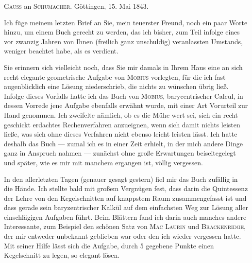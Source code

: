 \begin{center}\textsc{Gauss} an \textsc{Schumacher}. Göttingen, 15. Mai 1843.\end{center}

Ich füge meinem letzten Brief an Sie, mein teuerster Freund, noch ein paar Worte
hinzu, um einem Buch gerecht zu werden, das ich bisher, zum
Teil infolge eines vor zwanzig Jahren von Ihnen (freilich ganz unschuldig)
veranlassten Umstands, weniger beachtet habe, als es verdient.

Sie erinnern sich vielleicht noch, dass Sie mir damals in Ihrem Haus eine an sich
recht elegante geometrische Aufgabe von \textsc{Möbius} vorlegten, für die ich
fast augenblicklich eine Lösung niederschrieb, die nichts zu wünschen übrig ließ. Infolge
dieses Vorfalls hatte ich das Buch von \textsc{Möbius}, barycentrischer Calcul, in
dessen Vorrede jene Aufgabe ebenfalls erwähnt wurde, mit einer Art Vorurteil zur
Hand genommen. Ich zweifelte nämlich, ob es die Mühe wert sei, sich ein recht geschickt
erdachtes Rechenverfahren anzueignen, wenn sich damit nichts leisten
ließe, was sich ohne dieses Verfahren nicht ebenso leicht leisten lässt. Ich hatte deshalb das
Buch --- zumal ich es in einer Zeit erhielt, in der mich andere Dinge ganz
in Anspruch nahmen --- zunächst ohne große Erwartungen beiseitegelegt
und später, wie es mir mit manchem ergangen ist, völlig vergessen.

In den allerletzten Tagen (genauer gesagt gestern) fiel mir das Buch zufällig in die
Hände. Ich stellte bald mit großem Vergnügen fest, dass darin die Quintessenz der
Lehre von den Kegelschnitten auf knappstem Raum zusammengefasst ist und dass gerade sein
baryzentrischer Kalkül auf dem einfachsten Weg zur Lösung aller einschlägigen
Aufgaben führt. Beim Blättern fand ich darin auch manches andere Interessante,
zum Beispiel den schönen Satz von \textsc{Mac Laurin} und \textsc{Brackenridge},
der mir entweder unbekannt geblieben war oder den ich wieder vergessen hatte. Mit
seiner Hilfe lässt sich die Aufgabe, durch 5 gegebene Punkte einen Kegelschnitt zu legen, so
elegant lösen.
